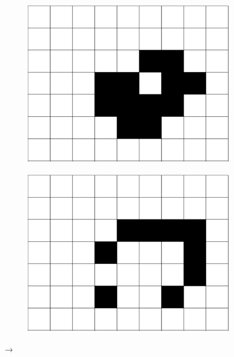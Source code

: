 \documentclass[12pt]{article}
\numberwithin{figure}{section} %
\begin{document}
\begin{figure}[H]
\begin{subfigure}{0.18\textwidth}
     \includegraphics[width=\linewidth]{Section1/5.3}
     \subcaption{}
   \end{subfigure}
   \begin{subfigure}{0.18\textwidth}
     \centering
     \includegraphics[width=\linewidth]{Section1/5.4}
     \subcaption{}
   \end{subfigure}
   {\LARGE$\rightarrow{}$}
\setcounter{subfigure}{0}
\centering
  \begin{subfigure}{0.18\textwidth}
     \centering

\end{subfigure}
\end{figure}
\end{document}
